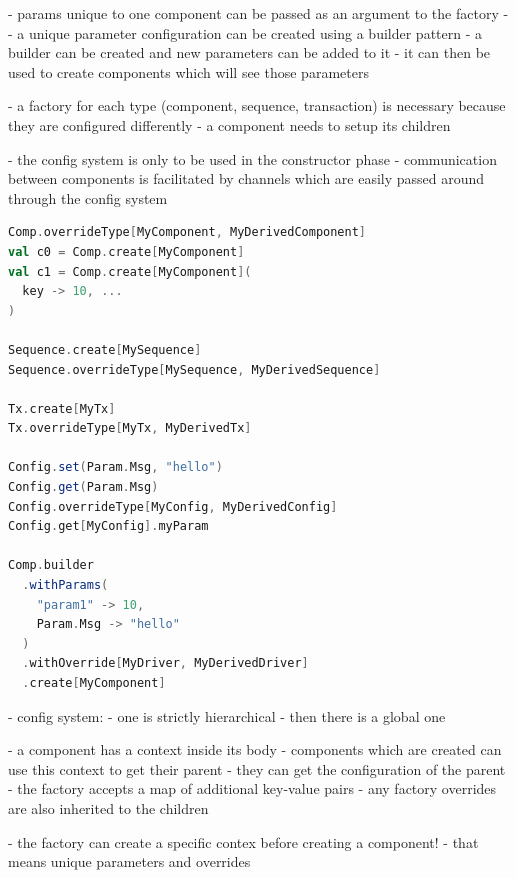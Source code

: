 - params unique to one component can be passed as an argument to the factory
-
- a unique parameter configuration can be created using a builder pattern
- a builder can be created and new parameters can be added to it
- it can then be used to create components which will see those parameters

- a factory for each type (component, sequence, transaction) is necessary because they are configured differently
- a component needs to setup its children

- the config system is only to be used in the constructor phase
- communication between components is facilitated by channels which are easily passed around through the config system


\begin{listing}
\begin{lstlisting}[language=scala, captionpos=b, caption=\todo{???.},label=lst:factory]
Comp.overrideType[MyComponent, MyDerivedComponent]
val c0 = Comp.create[MyComponent]
val c1 = Comp.create[MyComponent](
  key -> 10, ...
)

Sequence.create[MySequence]
Sequence.overrideType[MySequence, MyDerivedSequence]

Tx.create[MyTx]
Tx.overrideType[MyTx, MyDerivedTx]

Config.set(Param.Msg, "hello")
Config.get(Param.Msg)
Config.overrideType[MyConfig, MyDerivedConfig]
Config.get[MyConfig].myParam

Comp.builder
  .withParams(
    "param1" -> 10,
    Param.Msg -> "hello"
  )
  .withOverride[MyDriver, MyDerivedDriver]
  .create[MyComponent]

\end{lstlisting}
\end{listing}

- config system:
- one is strictly hierarchical
- then there is a global one

- a component has a context inside its body
- components which are created can use this context to get their parent
- they can get the configuration of the parent
- the factory accepts a map of additional key-value pairs
- any factory overrides are also inherited to the children

- the factory can create a specific contex before creating a component!
- that means unique parameters and overrides

